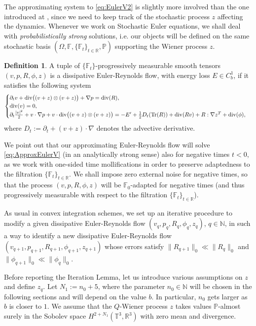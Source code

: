 \documentclass[10pt,a4paper]{amsart}
\numberwithin{equation}{section}
\numberwithin{corollario}{section}
\numberwithin{lemma}{section}
\numberwithin{prop}{section}
\theoremstyle{definition}
\newtheorem{defn}[thm]{Definition}
\theoremstyle{remark}
\newcommand{\N}{\mathbb{N}}
\newcommand{\R}{\mathbb{R}}
\newcommand{\T}{\mathbb{T}}
\newcommand{\dvg}{\mathord{{\rm div}}}
\DeclareMathOperator{\Tr}{Tr}
\newcommand{\qq}{_{q+1}}
\begin{document}
The approximating system to \eqref{eq:EulerV2} is slightly more involved than the one introduced at \cite{DLK23},  
since we need to keep track of the stochastic process $z$ affecting the dynamics.
Whenever we work on Stochastic Euler equations, we shall deal with \emph{probabilistically strong} solutions, i.e. our objects will be defined on the same stochastic basis $(\Omega, \mathbb{F},\{\mathbb{F}_t\}_{t \in \R}, \mathbb{P})$  supporting the Wiener process $z$. 

\begin{defn}\label{defn:Euler-Reynolds}
    A tuple of $\{\mathbb{F}_t\}$-progressively measurable smooth tensors $(v,p,R,\phi,z)$ is a dissipative Euler-Reynolds flow, with energy loss $E \in C^1_b$, if it satisfies the following system
    \begin{align} \label{eq:ApproxEulerV}
    \begin{cases}
    \partial_tv+\dvg\big((v+z)\otimes(v+z)\big)+\nabla p=\dvg(R),
    \\
    \dvg(v) = 0,
    \\
     \partial_t\frac{|v|^2}{2}+v\cdot \nabla p+v \cdot\dvg\big((v+z)\otimes (v+z)\big)=-E'
     +\frac{1}{2}D_t(\Tr(R))+\dvg(Rv)+R:\nabla z^T+\dvg (\phi),
    \end{cases}
    \end{align}
     where $D_t:=\partial_t+(v+z)\cdot \nabla$ denotes the advective derivative.
\end{defn}

We point out that our approximating Euler-Reynolds flow will solve \eqref{eq:ApproxEulerV} (in an analytically strong sense) also for negative times $t < 0$, as we work with one-sided time mollifications in order to preserve adaptedness to the filtration $\{\mathbb{F}_t\}_{t \in \R}$. We shall impose zero external noise for negative times, so that the process $(v,p,R,\phi,z)$ will be $\mathbb{F}_0$-adapted for negative times (and thus progressively measurable with respect to the filtration $\{\mathbb{F}_t\}_{t \in \R}$).

As usual in convex integration schemes, we set up an iterative procedure to modify a given dissipative Euler-Reynolds flow $(v_q,p_q,R_q,\phi_q,z_q)$, $q \in \N$, in such a way to identify a new dissipative Euler-Reynolds flow $(v\qq,p\qq,R\qq,\phi\qq,z\qq)$ whose errors satisfy $\|R\qq\|_0\ll\|R_q\|_0$ and $\|\phi\qq\|_0\ll\|\phi_q\|_0$.

Before reporting the Iteration Lemma, let us introduce various assumptions on $z$ and  define $z_q$.
Let $N_1:=n_0+5$, where the parameter $n_0\in \N$ will be chosen in the following sections and will depend on the value $b$. In particular, $n_0$ gets larger as $b$ is closer to $1$.
We assume that the $Q$-Wiener process $z$ takes values $\mathbb{P}$-almost surely in the Sobolev space $H^{2+N_1}(\T^3,\R^3)$ with zero mean and divergence. 
\end{document}
